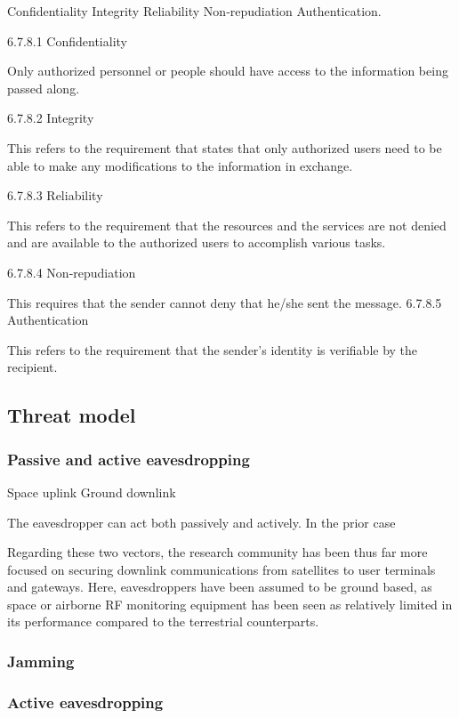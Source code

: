 \documentclass[english, 12pt, a4paper, elec, utf8, a-1b, online]{aaltothesis}
\begin{document}
    Confidentiality
    Integrity
    Reliability
    Non‐repudiation
    Authentication.

6.7.8.1 Confidentiality

    Only authorized personnel or people should have access to the information being passed along.

6.7.8.2 Integrity

    This refers to the requirement that states that only authorized users need to be able to make any modifications to the information in exchange.

6.7.8.3 Reliability

    This refers to the requirement that the resources and the services are not denied and are available to the authorized users to accomplish various tasks.

6.7.8.4 Non‐repudiation

This requires that the sender cannot deny that he/she sent the message.
6.7.8.5 Authentication

    This refers to the requirement that the sender's identity is verifiable by the recipient.




\subsection{Threat model}
\subsubsection{Passive and active eavesdropping}
Space uplink
Ground downlink

The eavesdropper can act both passively and actively.
In the prior case 

Regarding these two vectors, the research community has been thus far more focused on securing downlink communications from satellites to user terminals and gateways.
Here, eavesdroppers have been assumed to be ground based, as space or airborne RF monitoring equipment has been seen as relatively limited in its performance compared to the terrestrial counterparts.

\subsubsection{Jamming}

\subsubsection{Active eavesdropping}
\end{document}
